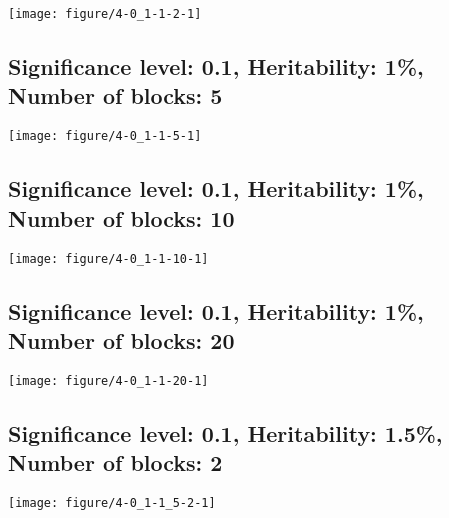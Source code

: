 \documentclass[11pt,letter]{article}\usepackage[]{graphicx}\usepackage[]{color}
\makeatletter
\def\maxwidth{ %
  \ifdim\Gin@nat@width>\linewidth
    \linewidth
  \else
    \Gin@nat@width
  \fi
}
\newenvironment{knitrout}{}{} %
\makeatother
\begin{document}
\begin{knitrout}
\color{fgcolor}
\texttt{[image: figure/4-0\_1-1-2-1]} 

\end{knitrout}

\newpage
\subsection{Significance level: 0.1, Heritability: 1\%, Number of blocks: 5}

\begin{knitrout}
\color{fgcolor}
\texttt{[image: figure/4-0\_1-1-5-1]} 

\end{knitrout}

\newpage
\subsection{Significance level: 0.1, Heritability: 1\%, Number of blocks: 10}

\begin{knitrout}
\color{fgcolor}
\texttt{[image: figure/4-0\_1-1-10-1]} 

\end{knitrout}

\newpage
\subsection{Significance level: 0.1, Heritability: 1\%, Number of blocks: 20}

\begin{knitrout}
\color{fgcolor}
\texttt{[image: figure/4-0\_1-1-20-1]} 

\end{knitrout}

\newpage
\subsection{Significance level: 0.1, Heritability: 1.5\%, Number of blocks: 2}

\begin{knitrout}
\color{fgcolor}
\texttt{[image: figure/4-0\_1-1\_5-2-1]} 

\end{knitrout}
\end{document}
